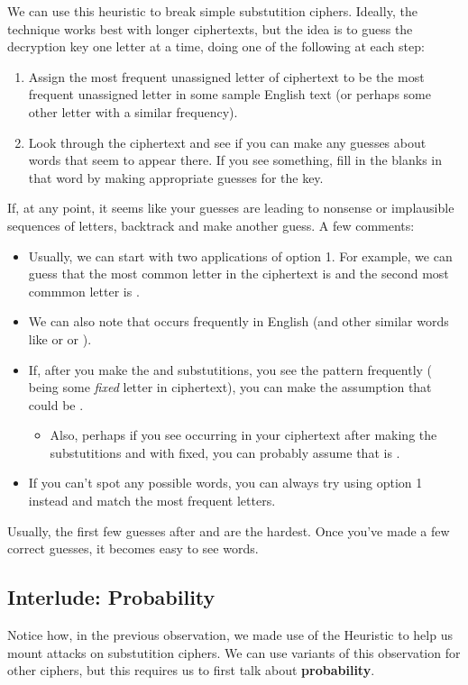 \documentclass[letterpaper]{article}
\begin{document}
We can use this heuristic to break simple substutition ciphers. Ideally, the technique works best with longer ciphertexts, but the idea is to guess the decryption key one letter at a time, doing one of the following at each step: 
\begin{enumerate}
    \item Assign the most frequent unassigned letter of ciphertext to be the most frequent unassigned letter in some sample English text (or perhaps some other letter with a similar frequency).
    \item Look through the ciphertext and see if you can make any guesses about words that seem to appear there. If you see something, fill in the blanks in that word by making appropriate guesses for the key.
\end{enumerate}
If, at any point, it seems like your guesses are leading to nonsense or implausible sequences of letters, backtrack and make another guess. A few comments: 
\begin{itemize}
    \item Usually, we can start with two applications of option 1. For example, we can guess that the most common letter in the ciphertext is  and the second most commmon letter is . 
    \item We can also note that  occurs frequently in English (and other similar words like  or  or ). 
    \item If, after you make the  and  substutitions, you see the  pattern frequently (\code{*} being some \emph{fixed} letter in ciphertext), you can make the assumption that \code{*} could be . 
    \begin{itemize}
        \item Also, perhaps if you see  occurring in your ciphertext after making the substutitions and with \code{*} fixed, you can probably assume that \code{*} is . 
    \end{itemize}

    \item If you can't spot any possible words, you can always try using option 1 instead and match the most frequent letters. 
\end{itemize}
Usually, the first few guesses after  and  are the hardest. Once you've made a few correct guesses, it becomes easy to see words.

\subsection{Interlude: Probability}
Notice how, in the previous observation, we made use of the Heuristic to help us mount attacks on substutition ciphers. We can use variants of this observation for other ciphers, but this requires us to first talk about \textbf{probability}.
\end{document}
